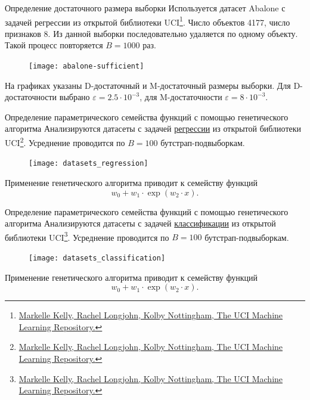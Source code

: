 \documentclass[10pt]{beamer}
\begin{document}
\begin{frame}{Определение достаточного размера выборки}
    Используется датасет Abalone с задачей регрессии из открытой библиотеки UCI\footnote{\href{https://archive.ics.uci.edu}{Markelle Kelly, Rachel Longjohn, Kolby Nottingham, The UCI Machine Learning Repository.}}. Число объектов 4177, число признаков 8. Из данной выборки последовательно удаляется по одному объекту. Такой процесс повторяется $B=1000$ раз.
    \vfill
    \begin{figure}[h!]
        \centering
        \texttt{[image: abalone-sufficient]}
    \end{figure}
    \vfill
    На графиках указаны D-достаточный и M-достаточный размеры выборки. Для D-достаточности выбрано $\varepsilon = 2.5 \cdot 10^{-3}$, для M-достаточности $\varepsilon = 8 \cdot 10^{-3}$.
\end{frame}
\begin{frame}{Определение параметрического семейства функций с помощью генетического алгоритма}
    Анализируются датасеты с задачей \underline{регрессии} из открытой библиотеки UCI\footnote{\href{https://archive.ics.uci.edu}{Markelle Kelly, Rachel Longjohn, Kolby Nottingham, The UCI Machine Learning Repository.}}. Усреднение проводится по $B=100$ бутстрап-подвыборкам.
    \vfill
    \begin{figure}[h!]
        \centering
        \texttt{[image: datasets\_regression]}
    \end{figure}
    \vfill
    Применение генетического алгоритма приводит к семейству функций
    \[ w_0 + w_1 \cdot \exp(w_2 \cdot x). \]
\end{frame}
\begin{frame}{Определение параметрического семейства функций с помощью генетического алгоритма}
    Анализируются датасеты с задачей \underline{классификации} из открытой библиотеки UCI\footnote{\href{https://archive.ics.uci.edu}{Markelle Kelly, Rachel Longjohn, Kolby Nottingham, The UCI Machine Learning Repository.}}. Усреднение проводится по $B=100$ бутстрап-подвыборкам.
    \vfill
    \begin{figure}[h!]
        \centering
        \texttt{[image: datasets\_classification]}
    \end{figure}
    \vfill
    Применение генетического алгоритма приводит к семейству функций
    \[ w_0 + w_1 \cdot \exp(w_2 \cdot x). \]
\end{frame}
\end{document}
